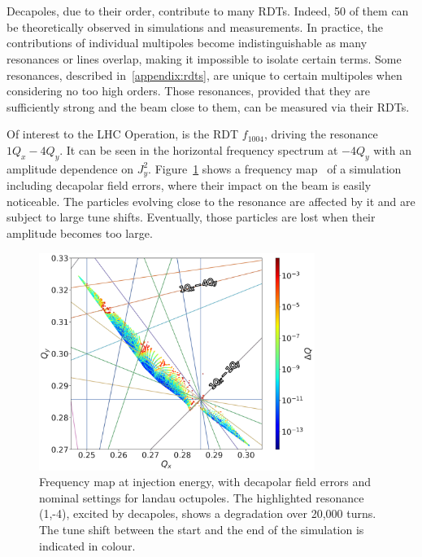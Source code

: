 \section{}

Decapoles, due to their order, contribute to many RDTs. Indeed, 50 of them can be theoretically 
observed in simulations and measurements. In practice, the contributions of individual multipoles
become indistinguishable as many resonances or lines overlap, making it impossible to isolate
certain terms. Some resonances, described in~\cref{appendix:rdts}, are unique to certain multipoles
when considering no too high orders. Those resonances, provided that they are sufficiently strong
and the beam close to them, can be measured via their RDTs.

Of interest to the LHC Operation, is the RDT $f_{1004}$, driving the resonance $1Q_x - 4Q_y$.
It can be seen in the horizontal frequency spectrum at $-4Q_y$ with an amplitude dependence on
$J_y^2$. 
Figure~\cref{fig:decapoles:rdts:tune_diagram} shows a frequency
map~\cite{yannis_papaphilippou_detecting_nodate} of a simulation including decapolar field errors,
where their impact on the beam is easily noticeable. The  particles evolving close to the
resonance are affected by it and are subject to large tune shifts. Eventually, those particles are 
lost when their amplitude becomes too large.

\begin{figure}[!htb]
    \centering
    \includegraphics[width=0.8\textwidth]{./images/tune_diagram_f1004.pdf}
    \caption{Frequency map at injection energy, with decapolar field errors and nominal settings for
    landau octupoles. The highlighted resonance (1,-4), excited by decapoles, shows a degradation
    over 20,000 turns. The tune shift between the start and the end of the simulation is indicated
    in colour. }
    \label{fig:decapoles:rdts:tune_diagram}
\end{figure}

